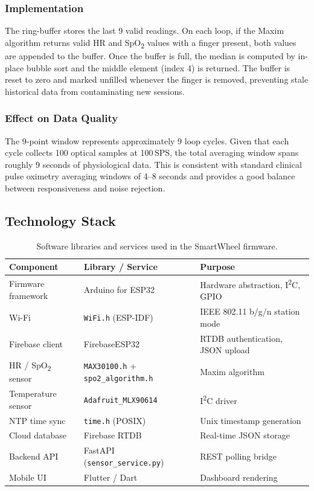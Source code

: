 \documentclass[12pt,a4paper]{report}
\begin{document}
\subsubsection{Implementation}

The ring-buffer stores the last 9 valid readings. On each loop, if the Maxim algorithm
returns valid HR and SpO\textsubscript{2} values with a finger present, both values are
appended to the buffer. Once the buffer is full, the median is computed by in-place bubble
sort and the middle element (index 4) is returned. The buffer is reset to zero and marked
unfilled whenever the finger is removed, preventing stale historical data from contaminating
new sessions.

\subsubsection{Effect on Data Quality}

The 9-point window represents approximately 9 loop cycles. Given that each cycle
collects 100 optical samples at 100\,SPS, the total averaging window spans roughly
9 seconds of physiological data. This is consistent with standard clinical pulse oximetry
averaging windows of 4–8 seconds and provides a good balance between responsiveness
and noise rejection.

\subsection{Technology Stack}

\begin{table}[H]
\centering
\caption{Software libraries and services used in the SmartWheel firmware.}
\begin{tabular}{@{}lll@{}}
\toprule
\textbf{Component} & \textbf{Library / Service} & \textbf{Purpose} \\
\midrule
Firmware framework     & Arduino for ESP32       & Hardware abstraction, I\textsuperscript{2}C, GPIO \\
Wi-Fi                  & \texttt{WiFi.h} (ESP-IDF) & IEEE 802.11 b/g/n station mode \\
Firebase client        & FirebaseESP32           & RTDB authentication, JSON upload \\
HR / SpO\textsubscript{2} sensor & \texttt{MAX30100.h} + \texttt{spo2\_algorithm.h} & Maxim algorithm \\
Temperature sensor     & \texttt{Adafruit\_MLX90614} & I\textsuperscript{2}C driver \\
NTP time sync          & \texttt{time.h} (POSIX)    & Unix timestamp generation \\
Cloud database         & Firebase RTDB            & Real-time JSON storage \\
Backend API            & FastAPI (\texttt{sensor\_service.py}) & REST polling bridge \\
Mobile UI              & Flutter / Dart           & Dashboard rendering \\
\bottomrule
\end{tabular}
\end{table}
\end{document}
